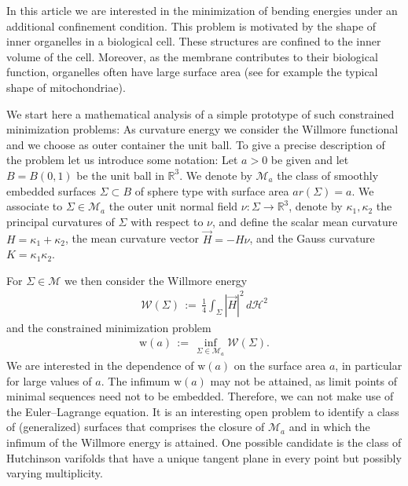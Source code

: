 \documentclass[reqno,makeidx,12pt]{amsart}
\theoremstyle{note}
\theoremstyle{definition}
\begin{document}
In this article we are interested in the minimization of bending energies under an additional {confinement} condition. This problem is motivated by the shape of inner organelles in a biological cell. These structures are confined to the inner volume of the cell. Moreover, as the membrane contributes to their biological function, organelles  often have large surface area (see for example the typical shape of mitochondriae).

We start here a mathematical analysis of a simple prototype of such constrained minimization problems: As curvature energy we consider the Willmore functional and we choose as outer container the unit ball. To give a precise description of the problem let us introduce some notation: Let $a>0$ be given and let $B=B(0,1)$ be the unit ball in ${\mathbb R}^3$. We denote by ${\mathcal{M}}_{a}$ the class of smoothly embedded surfaces $\Sigma\subset B$ of sphere type with surface area ${ar}(\Sigma)=a$. We associate to $\Sigma\in{\mathcal{M}}_a$ the outer unit normal field $\nu:\Sigma\to{\mathbb R}^3$, denote by  $\kappa_1, \kappa_2$ the principal curvatures of $\Sigma$ with respect to $\nu$, and define the scalar mean curvature $H=\kappa_1+\kappa_2$, the mean curvature vector $\vec{H}=-H\nu$, and the Gauss curvature $K=\kappa_1\kappa_2$.

For $\Sigma\in{\mathcal{M}}$ we then consider the Willmore energy
\begin{gather}
	{\mathcal{W}}(\Sigma)\,:=\, \frac{1}{4}\int_\Sigma |\vec{H}|^2\,d{\ensuremath{\mathcal{H}}}^2 \label{eq:willm}
\end{gather}
and the constrained minimization problem
\begin{gather}\label{eq:def-min-cs}
  {\text{w}}(a)\,:=\, \inf_{\Sigma\in{\mathcal{M}}_{a}} {\mathcal{W}}(\Sigma).
\end{gather}
We are interested in  the dependence of ${\text{w}}(a)$ on the surface area $a$, in particular for large values of $a$. The infimum ${\text{w}}(a)$ may not be attained, as limit points of minimal sequences need not to be embedded. Therefore, we can not make use of the Euler--Lagrange equation. It is an interesting open problem to identify a class of (generalized) surfaces that comprises the closure of ${\mathcal{M}}_a$ and in which the infimum of the Willmore energy is attained. One possible candidate is the class of Hutchinson varifolds that have a unique tangent plane in every point but possibly varying multiplicity.
\end{document}
